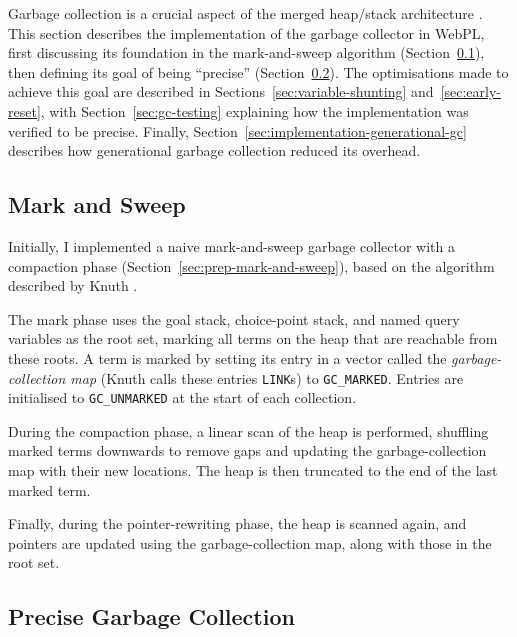 \label{sec:gc-impl}

Garbage collection is a crucial aspect of the merged heap/stack architecture \cite{liEfficientMemoryManagement2000}. This section describes the implementation of the garbage collector in WebPL, first discussing its foundation in the mark-and-sweep algorithm (Section~\ref{sec:mark-and-sweep}), then defining its goal of being ``precise'' (Section~\ref{sec:precise-gc}). The optimisations made to achieve this goal are described in Sections~\ref{sec:variable-shunting} and~\ref{sec:early-reset}, with Section~\ref{sec:gc-testing} explaining how the implementation was verified to be precise. Finally, Section~\ref{sec:implementation-generational-gc} describes how generational garbage collection reduced its overhead.

\subsection{Mark and Sweep}

\label{sec:mark-and-sweep}

Initially, I implemented a naive mark-and-sweep garbage collector with a compaction phase (Section~\ref{sec:prep-mark-and-sweep}), based on the algorithm described by Knuth \cite{knuthArtComputerProgramming1997}.

The mark phase uses the goal stack, choice-point stack, and named query variables as the root set, marking all terms on the heap that are reachable from these roots. A term is marked by setting its entry in a vector called the \emph{garbage-collection map} (Knuth calls these entries \texttt{LINK}s) to \texttt{GC\_MARKED}. Entries are initialised to \texttt{GC\_UNMARKED} at the start of each collection.

During the compaction phase, a linear scan of the heap is performed, shuffling marked terms downwards to remove gaps and updating the garbage-collection map with their new locations. The heap is then truncated to the end of the last marked term.

Finally, during the pointer-rewriting phase, the heap is scanned again, and pointers are updated using the garbage-collection map, along with those in the root set.

\subsection{Precise Garbage Collection}

\label{sec:precise-gc}

